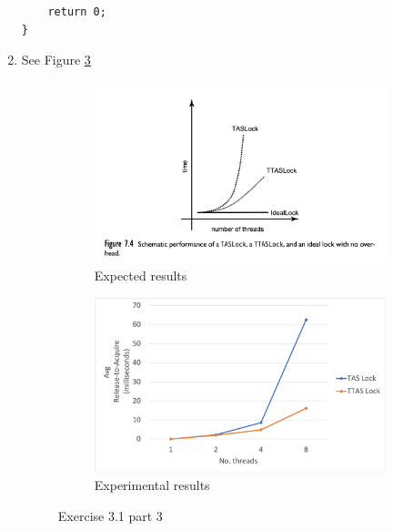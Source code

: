 \begin{solution}
\begin{enumerate}
{\begin{verbatim}
    return 0;
}
\end{verbatim}
\makebox[\linewidth]{\rule{17cm}{0.4pt}}
}
    \item See Figure \ref{fig:TASvTTAS_theory_v_practice}
        \begin{figure}[h]
         \centering
         \begin{subfigure}[b]{0.8\textwidth}
             \centering
             \includegraphics[width=\textwidth]{figure/plot_theory.png}
             \caption{Expected results}
             \label{fig:TASvTTAS_expected}
         \end{subfigure}
         \vfill
         \begin{subfigure}[b]{0.8\textwidth}
             \centering
             \includegraphics[width=\textwidth]{figure/correct_plot.png}
             \caption{Experimental results}
             \label{fig:TASvTTAS_experiment}
         \end{subfigure}
            \caption{Exercise 3.1 part 3}
            \label{fig:TASvTTAS_theory_v_practice}
        \end{figure}
    \end{enumerate}
\end{solution}

